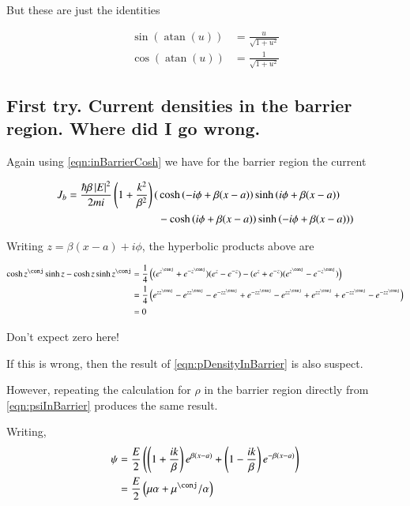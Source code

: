 \documentclass{article}
\DeclareMathOperator{\atan}{atan}
\begin{document}
But these are just the identities

\begin{align*}
\sin\left( \atan(u) \right) &= \frac{u}{\sqrt{1 + u^2}} \\
\cos\left( \atan(u) \right) &= \frac{1}{\sqrt{1 + u^2}}
\end{align*}

\subsection{ First try.  Current densities in the barrier region.  Where did I go wrong. }

Again using \ref{eqn:inBarrierCosh} we have for the barrier region the current

\begin{align*}
J_b
= \frac{\hbar \beta \left\lvert{E}\right\rvert^2}{2mi} \left(1 + \frac{k^2}{\beta^2} \right)
( 
&\cosh\left( -i\phi + \beta(x-a) \right) 
\sinh\left( i\phi + \beta(x-a) \right) \\
&-
\cosh\left( i\phi + \beta(x-a) \right) 
\sinh\left( -i\phi + \beta(x-a) \right) 
) \\
\end{align*}

Writing $z = \beta(x-a) + i\phi$, the hyperbolic products above are

\begin{align*}
\cosh z^\conj \sinh z - \cosh z \sinh z^\conj
&=
\inv{4} \left(
( e^{z^\conj} + e^{-z^\conj}) ( e^{z} - e^{-z}) 
- ( e^{z} + e^{-z}) ( e^{z^\conj} - e^{-z^\conj}) 
\right)
\\
&=
\inv{4} \left(
e^{z z^\conj} 
-e^{z z^\conj} 
-e^{-z z^\conj} 
+e^{-z z^\conj} 
- e^{z z^\conj}
+ e^{z z^\conj}
+ e^{-z z^\conj}
- e^{-z z^\conj} 
\right)
\\
&= 0
\end{align*}

Don't expect zero here!

If this is wrong, then the result of \ref{eqn:pDensityInBarrier} is also suspect.

However, repeating the calculation for $\rho$ in the barrier region directly from \ref{eqn:psiInBarrier} produces the same result.

Writing, 
\begin{align*}
\psi &=
\frac{E}{2}\left( \left( 1 + \frac{i k}{\beta} \right) e^{ \beta(x-a)} + \left( 1 - \frac{i k}{\beta} \right) e^{ -\beta(x-a)} \right) \\
&=
\frac{E}{2}\left( \mu \alpha + \mu^\conj/\alpha \right)
\end{align*}
\end{document}
